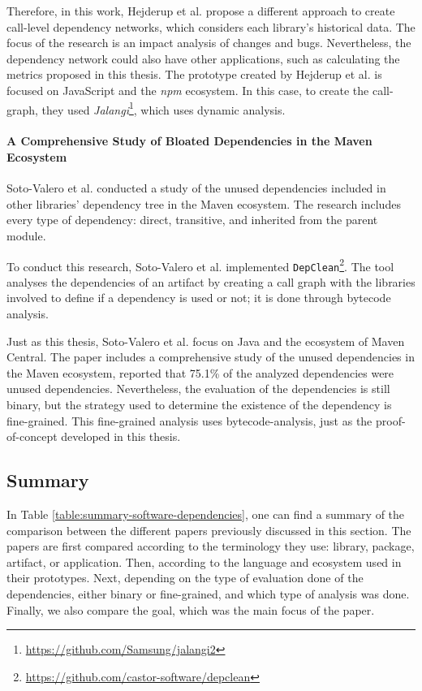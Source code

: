 Therefore, in this work, Hejderup et al. propose a different approach to create call-level dependency networks, which considers each library's historical data. The focus of the research is an impact analysis of changes and bugs. Nevertheless, the dependency network could also have other applications, such as calculating the metrics proposed in this thesis. The prototype created by Hejderup et al. is focused on JavaScript and the \textit{npm} ecosystem. In this case, to create the call-graph, they used \textit{Jalangi}\footnote{\href{https://github.com/Samsung/jalangi2}{https://github.com/Samsung/jalangi2}}, which uses dynamic analysis.

\paragraph{A Comprehensive Study of Bloated Dependencies in the Maven Ecosystem \cite{soto2020comprehensive}}
Soto-Valero et al. conducted a study of the unused dependencies included in other libraries' dependency tree in the Maven ecosystem. The research includes every type of dependency: direct, transitive, and inherited from the parent module.

To conduct this research, Soto-Valero et al. implemented \texttt{DepClean}\footnote{\href{https://github.com/castor-software/depclean}{https://github.com/castor-software/depclean}}. The tool analyses the dependencies of an artifact by creating a call graph with the libraries involved to define if a dependency is used or not; it is done through bytecode analysis.

Just as this thesis, Soto-Valero et al. focus on Java and the ecosystem of Maven Central. The paper includes a comprehensive study of the unused dependencies in the Maven ecosystem, reported that 75.1\% of the analyzed dependencies were unused dependencies. Nevertheless, the evaluation of the dependencies is still binary, but the strategy used to determine the existence of the dependency is fine-grained. This fine-grained analysis uses bytecode-analysis, just as the proof-of-concept developed in this thesis.

\subsection{Summary}

In Table \ref{table:summary-software-dependencies}, one can find a summary of the comparison between the different papers previously discussed in this section. The papers are first compared according to the terminology they use: library, package, artifact, or application. Then, according to the language and ecosystem used in their prototypes. Next, depending on the type of evaluation done of the dependencies, either binary or fine-grained, and which type of analysis was done. Finally, we also compare the goal, which was the main focus of the paper.

